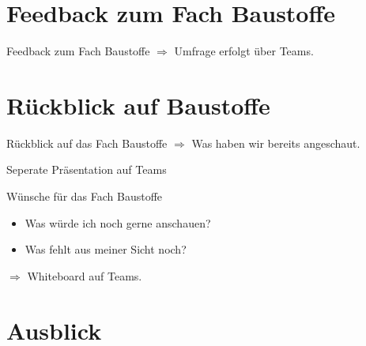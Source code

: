 \section{Feedback zum Fach Baustoffe}
\BlueSectionSlide
\begin{frame}{Feedback zum Fach Baustoffe}
	$\Rightarrow$ Umfrage erfolgt über Teams.
\end{frame}


\section{Rückblick auf Baustoffe}
\BlueSectionSlide
\begin{frame}{Rückblick auf das Fach Baustoffe }
	$\Rightarrow$ Was haben wir bereits angeschaut.

	Seperate Präsentation auf Teams
\end{frame}



\begin{frame}{Wünsche für das Fach Baustoffe}

	\begin{itemize}
		\item[\textbullet] Was würde ich noch gerne anschauen? 
		\item[\textbullet] Was fehlt aus meiner Sicht noch?  
	\end{itemize}

	\vspace{1cm}

	$\Rightarrow$ Whiteboard auf Teams.
\end{frame}






%
%


\section{Ausblick}
\BlueSectionSlide

